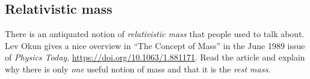 \documentclass[12pt]{article}
\numberwithin{equation}{section}    %
\begin{document}
\subsection{Relativistic mass}

There is an antiquated notion of \emph{relativistic mass} that people used to talk about. Lev Okun gives a nice overview in ``The Concept of Mass'' in the June 1989 issue of \emph{Physics Today}, \url{https://doi.org/10.1063/1.881171}. Read the article and explain why there is only \emph{one} useful notion of mass and that it is the \emph{rest mass}.
\end{document}
